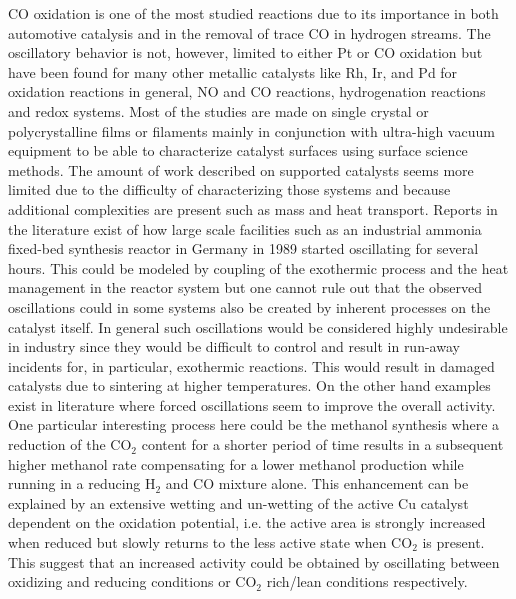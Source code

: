 \documentclass[journal=jacsat,manuscript=article]{achemso}
\begin{document}
CO oxidation is one of the most studied reactions due to its importance in both
automotive catalysis and in the removal of trace CO in hydrogen
streams\cite{IbsBog,Zhang2011}. The oscillatory behavior is not, however, limited to
either Pt or CO oxidation but have been found for many other metallic catalysts
like Rh, Ir, and Pd for oxidation reactions in general, NO and CO reactions,
hydrogenation reactions \cite{Lund2000,SALES1982} and redox
systems\cite{Ibele2010}. Most of the studies
are made on single crystal or polycrystalline films or filaments mainly in
conjunction with ultra-high vacuum equipment to be able to characterize
catalyst surfaces using surface science methods. The amount of work described
on supported catalysts seems more limited due to the difficulty of
characterizing those systems and because additional complexities are present
such as mass and heat transport\cite{Meunier2008}. Reports in the literature
exist of how large
scale facilities such as an industrial ammonia fixed-bed synthesis reactor in
Germany in 1989 started oscillating for several hours. This could be modeled by
coupling of the exothermic process and the heat management in the reactor
system \cite{Morud1998} but one cannot rule out that the observed oscillations
could in some systems also be created by inherent processes on the catalyst
itself. In general such oscillations would be considered highly undesirable in
industry since they would be difficult to control and result in run-away
incidents for, in particular, exothermic reactions. This would result in
damaged catalysts due to sintering at higher temperatures. On the other hand
examples exist in literature where forced oscillations seem to improve the
overall activity\cite{IMBIHL1995,Machado2005}. One particular interesting
process here could be the methanol synthesis where a reduction of the CO$_2$
content for a shorter period of time results in a subsequent higher methanol
rate compensating for a lower methanol production while running in a
reducing H$_2$ and CO mixture alone\cite{Dynamics-Bog}. This enhancement can
be explained by an extensive wetting and un-wetting of the active Cu catalyst
dependent on the oxidation potential\cite{Hansen2002}, i.e. the active area is
strongly increased when reduced but slowly returns to the less active state
when CO$_2$ is present. This suggest that an increased activity could be
obtained by oscillating between oxidizing and reducing conditions or CO$_2$
rich/lean conditions respectively.
\end{document}

